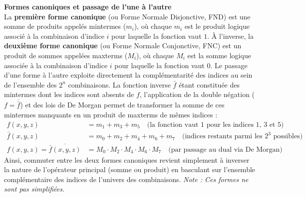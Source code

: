 \documentclass[a4paper,11pt]{article}
\begin{document}
\vspace{0.3cm}
\noindent\textbf{Formes canoniques et passage de l'une à l'autre}\\
La \textbf{première forme canonique} (ou Forme Normale Disjonctive, FND) est une somme de produits appelés mintermes ($m_i$), où chaque $m_i$ est le produit logique associé à la combinaison d'indice $i$ pour laquelle la fonction vaut $1$. À l'inverse, la \textbf{deuxième forme canonique} (ou Forme Normale Conjonctive, FNC) est un produit de sommes appelées maxterms ($M_i$), où chaque $M_i$ est la somme logique associée à la combinaison d'indice $i$ pour laquelle la fonction vaut $0$. Le passage d'une forme à l'autre exploite directement la complémentarité des indices au sein de l'ensemble des $2^n$ combinaisons. La fonction inverse $\bar{f}$ étant constituée des mintermes dont les indices sont absents de $f$, l'application de la double négation ($f = \overline{\bar{f}}$) et des lois de De Morgan permet de transformer la somme de ces mintermes manquants en un produit de maxterms de mêmes indices :
\begin{align*}
    f(x, y, z) &= m_1 + m_3 + m_5 \quad \text{(la fonction vaut 1 pour les indices 1, 3 et 5)} \\
    \bar{f}(x, y, z) &= m_0 + m_2 + m_4 + m_6 + m_7 \quad \text{(indices restants parmi les } 2^3 \text{ possibles)} \\
    f(x, y, z) = \overline{\bar{f}(x, y, z)} &= M_0 \cdot M_2 \cdot M_4 \cdot M_6 \cdot M_7 \quad \text{(par passage au dual via De Morgan)}
\end{align*}
Ainsi, commuter entre les deux formes canoniques revient simplement à inverser la nature de l'opérateur principal (somme ou produit) en basculant sur l'ensemble complémentaire des indices de l'univers des combinaisons.
\textit{Note : Ces formes ne sont pas simplifiées.}
\end{document}
